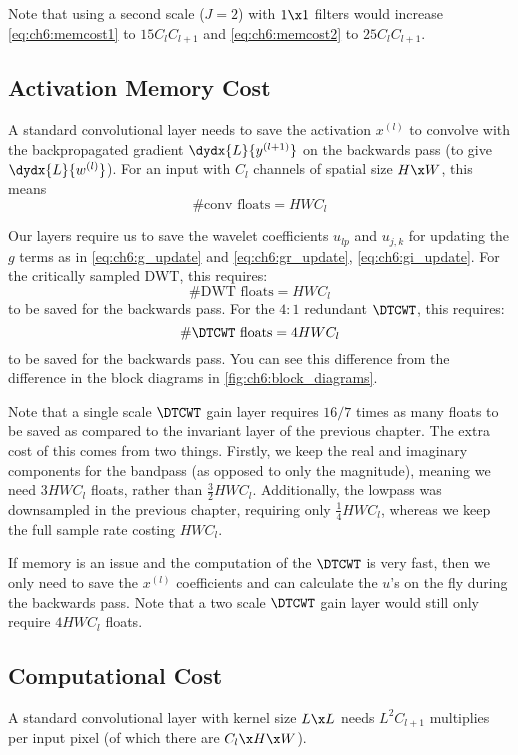 Note that using a second scale ($J=2$) with $1\x 1$ filters would increase
\eqref{eq:ch6:memcost1} to $15C_lC_{l+1}$ and \eqref{eq:ch6:memcost2} to
$25C_lC_{l+1}$.  

\subsection{Activation Memory Cost}\label{sec:ch6:act_memory}
A standard convolutional layer needs to save the activation $x^{(l)}$ to
convolve with the backpropagated gradient $\dydx{L}{y^{(l+1)}}$ on the backwards
pass (to give $\dydx{L}{w^{(l)}}$). For an input with $C_l$ channels of spatial
size $H\x W$, this means
%
\begin{equation}
  \text{\#conv floats} = HWC_l 
\end{equation}

Our layers require us to save the wavelet coefficients $u_{lp}$ and  $u_{j,k}$
for updating the $g$ terms as in \eqref{eq:ch6:g_update} and
\eqref{eq:ch6:gr_update}, \eqref{eq:ch6:gi_update}.  For the critically sampled
DWT, this requires:
%
\begin{equation}
  \text{\#DWT floats} = HWC_l 
\end{equation}
%
to be saved for the backwards pass. For the $4:1$ redundant $\DTCWT$, this 
requires:
%
\begin{equation}
  \text{\#$\DTCWT$ floats} = 4HWC_l 
\end{equation}
%
to be saved for the backwards pass.  You can see this difference from the
difference in the block diagrams in \autoref{fig:ch6:block_diagrams}.

Note that a single scale $\DTCWT$ gain layer requires $16/7$ times as many
floats to be saved as compared to the invariant layer of the previous chapter.
The extra cost of this comes from two things. Firstly, we keep the real and
imaginary components for the bandpass (as opposed to only the magnitude),
meaning we need $3HWC_l$ floats, rather than $\frac{3}{2}HWC_l$. Additionally,
the lowpass was downsampled in the previous chapter, requiring only
$\frac{1}{4}HWC_l$, whereas we keep the full sample rate costing $HWC_l$.

If memory is an issue and the computation of the $\DTCWT$ is very fast, then we
only need to save the $x^(l)$ coefficients and can calculate the $u$'s on the
fly during the backwards pass. Note that a two scale $\DTCWT$ gain layer would
still only require $4HWC_l$ floats.

\subsection{Computational Cost}\label{sec:ch6:computation}
A standard convolutional layer with kernel size $L\x L$ needs $L^2C_{l+1}$
multiplies per input pixel (of which there are $C_{l}\x H\x W$).

